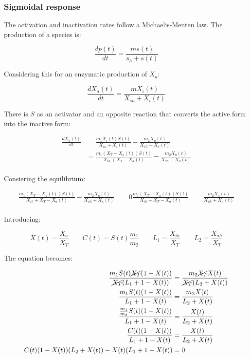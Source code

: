     \subsubsection{Sigmoidal response}
    The activation and inactivation rates follow a Michaelis-Menten law.
    The production of a species is:

    $$\frac{dp(t)}{dt} = \frac{ms(t)}{s_h + s(t)}$$

    Considering this for an enzymatic production of $X_a$:

    $$\frac{dX_a(t)}{dt} = \frac{mX_i(t)}{X_{sh} + X_i(t)}$$

    There is $S$ as an activator and an opposite reaction that converts the active form into the inactive form:

    \begin{align*}
      \frac{dX_a(t)}{dt} &= \frac{m_1X_i(t)S(t)}{X_{ih} + X_i(t)} - \frac{m_2X_a(t)}{X_{ah} + X_a(t)}\\
                         &= \frac{m_1(X_T-X_a(t))S(t)}{X_{ih} +X_T - X_a(t)} - \frac{m_2X_a(t)}{X_{ah} + X_a(t)}\\
    \end{align*}

    Consiering the equilibrium:

    \begin{align*}
      \frac{m_1(X_T-X_a(t))S(t)}{X_{ih} +X_T - X_a(t)} - \frac{m_2X_a(t)}{X_{ah} + X_a(t)} &= 0
      \frac{m_1(X_T-X_a(t))S(t)}{X_{ih} +X_T - X_a(t)} &= \frac{m_2X_a(t)}{X_{ah} + X_a(t)}\\
    \end{align*}

    Introducing:

    $$X(t) = \frac{X_a}{X_T}\qquad C(t) = S(t)\frac{m_1}{m_2}\qquad L_1 = \frac{X_{ih}}{X_T}\qquad L_2 = \frac{X_{ah}}{X_T}$$

    The equation becomes:

    \begin{align*}
      \frac{m_1S(t)\cancel{X_T}(1-X(t))}{\cancel{X_T}(L_1 + 1 - X(t))} &= \frac{m_2\cancel{X_T}X(t)}{\cancel{X_T}(L_2 + X(t))}\\
      \frac{m_1S(t)(1-X(t))}{L_1 + 1 - X(t)} &= \frac{m_2X(t)}{L_2 + X(t)}\\
      \frac{\frac{m_1}{m_2}S(t)(1-X(t))}{L_1 + 1 - X(t)} &= \frac{X(t)}{L_2 + X(t)}\\
      \frac{C(t)(1-X(t))}{L_1+1-X(t)} &= \frac{X(t)}{L_2 + X(t)}\\
      C(t)(1-X(t))(L_2 + X(t)) - X(t)(L_1+1-X(t)) &= 0\\
    \end{align*}


